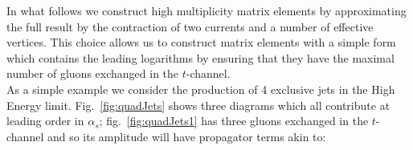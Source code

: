 










		In what follows we construct high multiplicity matrix elements by approximating the full result
		by the contraction of two currents and a number of effective vertices.  This choice allows us
		to construct matrix elements with a simple form which contains the leading logarithms by
		ensuring that they have the maximal number of gluons exchanged in the $t$-channel.\\
		As a simple example we consider the production of 4 exclusive jets in the High Energy limit.
		Fig.~\eqref{fig:quadJets} shows three diagrams which all contribute at leading order in $\alpha_s$;
		fig.~\eqref{fig:quadJets1} has three gluons exchanged in the $t$-channel and so its amplitude will
		have propagator terms akin to:

